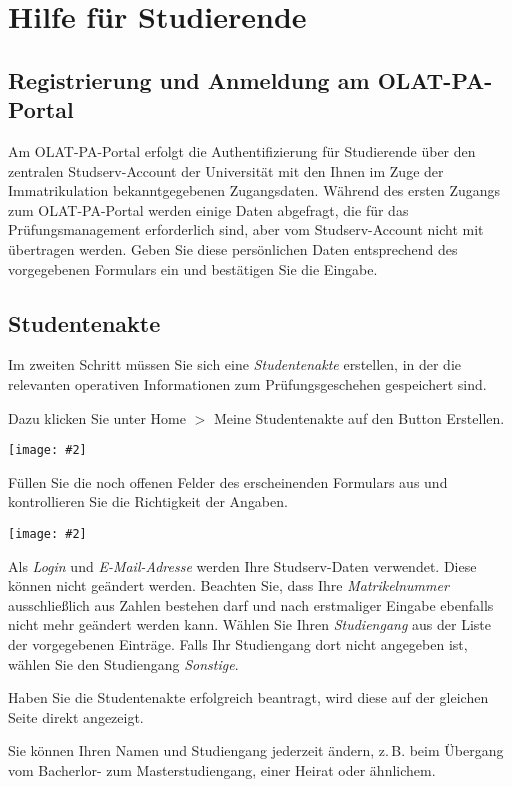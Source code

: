 \documentclass[a4paper,11pt]{article}
\newcommand{\bild}[2]{
    \begin{center}\texttt{[image: \#2]}\end{center}
}
\newcommand{\knopf}[1]{{\sc #1}}
\begin{document}
\clearpage
\section{Hilfe für Studierende}

\subsection{Registrierung und Anmeldung am OLAT-PA-Portal}

Am OLAT-PA-Portal erfolgt die Authentifizierung für Studierende über den
zentralen Studserv-Account der Universität mit den Ihnen im Zuge der
Immatrikulation bekanntgegebenen Zugangsdaten.  Während des ersten Zugangs zum
OLAT-PA-Portal werden einige Daten abgefragt, die für das Prüfungsmanagement
erforderlich sind, aber vom Studserv-Account nicht mit übertragen werden.
Geben Sie diese persönlichen Daten entsprechend des vorgegebenen Formulars ein
und bestätigen Sie die Eingabe.

\subsection{Studentenakte}

Im zweiten Schritt müssen Sie sich eine {\em Studentenakte}
erstellen, in der die relevanten operativen Informationen zum
Prüfungsgeschehen gespeichert sind. 

Dazu klicken Sie unter \knopf{Home $>$ Meine Studentenakte} auf den Button
\knopf{Erstellen}.

\bild{1}{ESA-Erstellen}

Füllen Sie die noch offenen Felder des erscheinenden Formulars aus und
kontrollieren Sie die Richtigkeit der Angaben.

\bild{1}{ESA-Eingaben}

Als {\em Login} und {\em E-Mail-Adresse} werden Ihre Studserv-Daten verwendet.
Diese können nicht geändert werden. Beachten Sie, dass Ihre {\em Matrikelnummer}
ausschließlich aus Zahlen bestehen darf und nach erstmaliger Eingabe ebenfalls
nicht mehr geändert werden kann. Wählen Sie Ihren {\em Studiengang}
aus der Liste der vorgegebenen Einträge.  Falls Ihr Studiengang dort nicht
angegeben ist, wählen Sie den Studiengang {\em Sonstige}.

Haben Sie die Studentenakte erfolgreich beantragt, wird diese auf der gleichen
Seite direkt angezeigt.

Sie können Ihren Namen und Studiengang jederzeit ändern, z.\,B. beim
Übergang vom Bacherlor- zum Masterstudiengang, einer Heirat oder ähnlichem.
\end{document}
